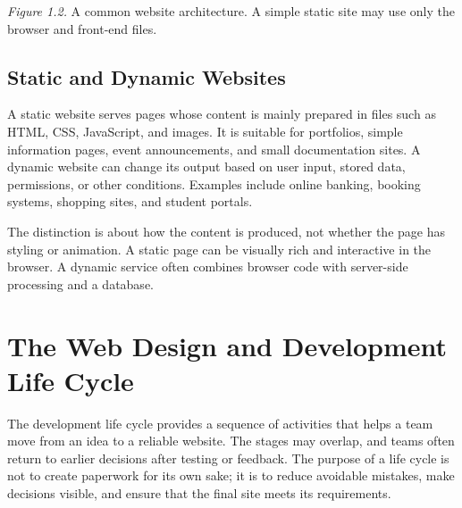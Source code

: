 \documentclass[11pt,openany,oneside]{book}
\begin{document}
\begin{center}
\end{center}
\textit{Figure 1.2.} A common website architecture. A simple static site may use only the browser and front-end files.

\subsection{Static and Dynamic Websites}
A static website serves pages whose content is mainly prepared in files such as HTML, CSS, JavaScript, and images. It is suitable for portfolios, simple information pages, event announcements, and small documentation sites. A dynamic website can change its output based on user input, stored data, permissions, or other conditions. Examples include online banking, booking systems, shopping sites, and student portals.

The distinction is about how the content is produced, not whether the page has styling or animation. A static page can be visually rich and interactive in the browser. A dynamic service often combines browser code with server-side processing and a database.

\section{The Web Design and Development Life Cycle}
The development life cycle provides a sequence of activities that helps a team move from an idea to a reliable website. The stages may overlap, and teams often return to earlier decisions after testing or feedback. The purpose of a life cycle is not to create paperwork for its own sake; it is to reduce avoidable mistakes, make decisions visible, and ensure that the final site meets its requirements.
\end{document}
